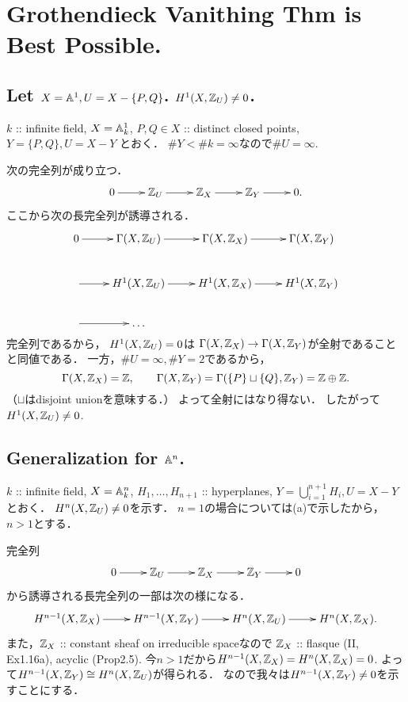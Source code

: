 \documentclass[a4paper]{jsarticle}
\begin{document}
\section{Grothendieck Vanithing Thm is Best Possible.} %
    \subsection{Let $X=\mathbb{A}^1, U=X-\{P,Q\}$. $H^1(X, \mathbb{Z}_U) \neq 0$.}
    $k$ :: infinite field,
    $X=\mathbb{A}^1_k$,
    $P, Q \in X$ :: distinct closed points,
    $Y=\{P,Q\}, U=X-Y$
    とおく．
    $\#Y<\#k=\infty$なので$\#U=\infty.$
    
    次の完全列が成り立つ．
    \[\xymatrix{ 0 \ar[r]& \Z_U \ar[r]& \Z_X \ar[r]& \Z_Y \ar[r]& 0. }\]
    ここから次の長完全列が誘導される．
    \[
    \xymatrix
    {
        0  \ar[r]& \Gamma(X, \Z_U) \ar[r]& \Gamma(X, \Z_X) \ar[r]& \Gamma(X, \Z_Y) \\
        {} \ar[r]& H^1(X, \Z_U) \ar[r]& H^1(X, \Z_X) \ar[r]& H^1(X, \Z_Y) \\
        {} \ar[r]& \dots
    }
    \]
    完全列であるから，
    $H^1(X, \mathbb{Z}_U)=0$は
    $\Gamma(X, \mathbb{Z}_X) \to \Gamma(X, \mathbb{Z}_Y)$が全射であることと同値である．
    一方，$\#U=\infty, \#Y=2$であるから，
    \[
        \Gamma(X, \mathbb{Z}_X)=\mathbb{Z},
        \qquad
        \Gamma(X, \mathbb{Z}_Y)=\Gamma(\{P\} \sqcup \{Q\}, \mathbb{Z}_Y)=\mathbb{Z} \oplus \mathbb{Z}.
    \]
    （$\sqcup$はdisjoint unionを意味する．）
    よって全射にはなり得ない．
    したがって$H^1(X, \mathbb{Z}_U) \neq 0$.

    \subsection{Generalization for $\mathbb{A}^n$.}
    $k$ :: infinite field,
    $X=\mathbb{A}^n_k$,
    $H_1,\dots,H_{n+1}$ :: hyperplanes,
    $Y=\bigcup_{i=1}^{n+1} H_i, U=X-Y$
    とおく．
    $H^n(X, \mathbb{Z}_U) \neq 0$を示す．
    $n=1$の場合については(a)で示したから，
    $n>1$とする．

    完全列
    \[\xymatrix{ 0 \ar[r]& \Z_U \ar[r]& \Z_X \ar[r]& \Z_Y \ar[r]& 0 }\]
    から誘導される長完全列の一部は次の様になる．
    \[\xymatrix{ H^{n-1}(X, \Z_X) \ar[r]& H^{n-1}(X, \Z_Y) \ar[r]& H^{n}(X, \Z_U) \ar[r]& H^{n}(X, \Z_X). }\]
    また，$\mathbb{Z}_X$ :: constant sheaf on irreducible spaceなので
    $\mathbb{Z}_X$ :: flasque (II, Ex1.16a), acyclic (Prop2.5).
    今$n>1$だから$H^{n-1}(X, \mathbb{Z}_X)=H^{n}(X, \mathbb{Z}_X)=0$.
    よって$H^{n-1}(X, \mathbb{Z}_Y) \cong H^{n}(X, \mathbb{Z}_U)$が得られる．
    なので我々は$H^{n-1}(X, \mathbb{Z}_Y) \neq 0$を示すことにする．
\end{document}

